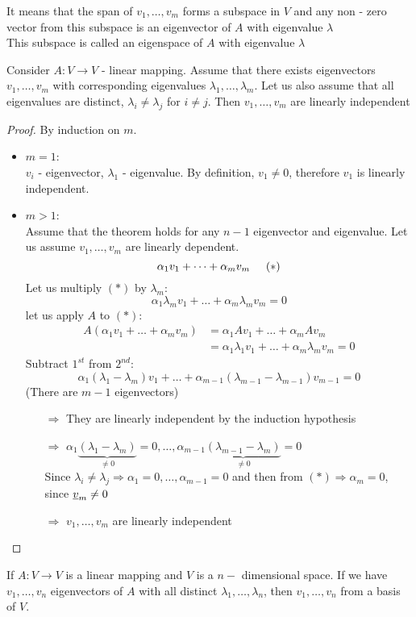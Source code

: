 \begin{remark}
It means that the span of $v_1,\dots,v_m$ forms a subspace in $V$ and any non - zero vector from this subspace is an eigenvector of $A$ with eigenvalue $\lambda$\\

This subspace is called an eigenspace of $A$ with eigenvalue $\lambda$	
\end{remark}

\begin{theorem}
Consider $A:V\to V$ - linear mapping. Assume that there exists eigenvectors $v_1,\dots,v_m$ with corresponding eigenvalues $\lambda_1,\dots,\lambda_m$. Let us also assume that all eigenvalues are distinct, $\lambda_i \not=\lambda_j$ for $i\not= j$. Then $v_1,\dots,v_m$ are linearly independent
\end{theorem}

\begin{proof}
By induction on $m$.
\begin{itemize}
\item $m = 1$: \\
$v_i$ - eigenvector, $\lambda_1$ - eigenvalue. By definition, $v_1\not=0$, therefore $v_1$ is linearly independent. 

\item $m>1$:\\
Assume that the theorem holds for any $n-1$ eigenvector and eigenvalue. Let us assume $v_1,\dots,v_m$ are linearly dependent. 
\[
\alpha_1 v_1 + \dots + \alpha_m v_m\hspace{5mm}(\ast)
\]
Let us multiply $(\ast)$ by $\lambda_m$:
\[
\alpha_1 \lambda_m v_1 + \dots + \alpha_m \lambda_m v_m = 0
\]
let us apply $A$ to $(\ast)$:
\begin{align*}
A(\alpha_1 v_1 + \dots + \alpha_m v_m) &= \alpha_1 A v_1 + \dots + \alpha_m A v_m\\
&= \alpha_1 \lambda_1 v_1 + \dots + \alpha_m\lambda_m v_m = 0
\end{align*}
Subtract $1^{st}$ from $2^{nd}$:
\[
\alpha_1(\lambda_1 - \lambda_m)v_1+\dots+\alpha_{m-1}(\lambda_{m-1} - \lambda_{m-1})v_{m-1} = 0
\]
(There are ${m-1}$ eigenvectors)
\begin{enumerate}
\item[$\Rightarrow$] They are linearly independent by the induction hypothesis
\item[$\Rightarrow$] $\alpha_1 \underbrace{(\lambda_1-\lambda_m)}_{\not=0} = 0, \dots,\alpha_{m-1} \underbrace{(\lambda_{m-1}-\lambda_m)}_{\not=0} = 0$\\

Since $\lambda_i\not=\lambda_j\Rightarrow \alpha_1=0,\dots,\alpha_{m-1} = 0$ and then from $(\ast)\Rightarrow\alpha_m = 0$, since $\underline{v}_m \not=0$
\item[$\Rightarrow$] $v_1,\dots,v_m$ are linearly independent 
\end{enumerate}
\end{itemize}
\end{proof}

\begin{remark}
If $A:V\to V$ is a linear mapping and $V$ is a $n-$ dimensional space. If we have $v_1,\dots,v_n$	 eigenvectors of $A$ with all distinct $\lambda_1,\dots,\lambda_n$, then $v_1,\dots,v_n$ from a basis of $V$.
\end{remark}

